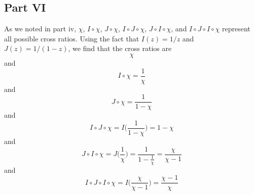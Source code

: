 \documentclass[12pt]{article}
\begin{document}
\subsection*{Part VI}
As we noted in part iv, $\chi$, $I \circ \chi$, $J \circ \chi$, $I \circ J \circ \chi$, $J \circ I \circ \chi$, and $I \circ J \circ I \circ \chi$ represent all possible cross ratios. Using the fact that $I(z) = 1/z$ and $J(z) = 1/(1-z)$, we find that the cross ratios are
\[
\chi
\] and
\[
I \circ \chi = \frac{1}{\chi}
\] and
\[
J \circ \chi = \frac{1}{1-\chi}
\] and
\[
I \circ J \circ \chi = I\bigg( \frac{1}{1-\chi}\bigg) = 1-\chi
\] and
\[
J \circ I \circ \chi = J\bigg(\frac{1}{\chi}\bigg) = \frac{1}{1-\frac{1}{\chi}} = \frac{\chi}{\chi - 1}
\] and 
\[
I \circ J \circ I \circ \chi = I\bigg(\frac{\chi}{\chi - 1}\bigg) = \frac{\chi - 1}{\chi}
\]
\end{document}
